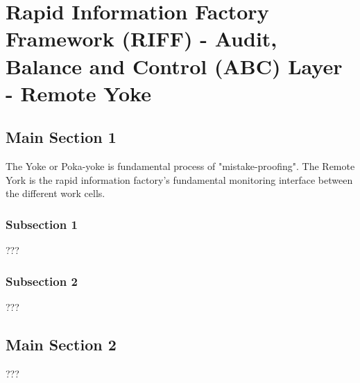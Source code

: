 
\chapter{Rapid Information Factory Framework (RIFF) - Audit, Balance and Control (ABC) Layer - Remote Yoke} %

\label{Chapter30} %



\section{Main Section 1}

The Yoke or Poka-yoke is fundamental process of "mistake-proofing". The Remote York is the rapid information factory's fundamental monitoring interface between the different work cells.

\subsection{Subsection 1}

???


\subsection{Subsection 2}

???


\section{Main Section 2}

???
